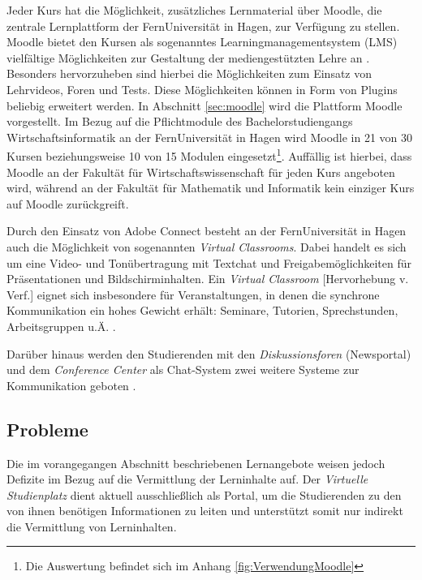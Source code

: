 Jeder Kurs hat die Möglichkeit, zusätzliches Lernmaterial über Moodle, die zentrale Lernplattform der FernUniversität in Hagen, zur Verfügung zu stellen. Moodle bietet den Kursen \glqq als sogenanntes Learningmanagementsystem (LMS) vielfältige Möglichkeiten zur Gestaltung der mediengestützten Lehre an\grqq{} \citep{fernuniversitaet2018moodle}. Besonders hervorzuheben sind hierbei die Möglichkeiten zum Einsatz von Lehrvideos, Foren und Tests. Diese Möglichkeiten können in Form von Plugins beliebig erweitert werden. In Abschnitt \ref{sec:moodle} wird die Plattform Moodle vorgestellt. Im Bezug auf die Pflichtmodule des Bachelorstudiengangs Wirtschaftsinformatik an der FernUniversität in Hagen wird Moodle in 21 von 30 Kursen beziehungsweise 10 von 15 Modulen eingesetzt\footnote{Die Auswertung befindet sich im Anhang \ref{fig:VerwendungMoodle}}. Auffällig ist hierbei, dass Moodle an der Fakultät für Wirtschaftswissenschaft für jeden Kurs angeboten wird, während an der Fakultät für Mathematik und Informatik kein einziger Kurs auf Moodle zurückgreift.

 


Durch den Einsatz von Adobe Connect besteht an der FernUniversität in Hagen auch die Möglichkeit von sogenannten \textit{Virtual Classrooms}. Dabei handelt es sich um eine Video- und Tonübertragung mit Textchat und Freigabemöglichkeiten für Präsentationen und Bildschirminhalten. \glqq Ein \emph{Virtual Classroom} [Hervorhebung v. Verf.] eignet sich insbesondere für Veranstaltungen, in denen die synchrone Kommunikation ein hohes Gewicht erhält: Seminare, Tutorien, Sprechstunden, Arbeitsgruppen u.Ä.\grqq{} \citep{fernuniversitaet2018kommunikationstools}.

Darüber hinaus werden den Studierenden mit den \textit{Diskussionsforen} (Newsportal) und dem \textit{Conference Center} als Chat-System zwei weitere Systeme zur Kommunikation geboten \citep{fernuniversitaet2018kommunikationstools}.


\subsection{Probleme}
Die im vorangegangen Abschnitt beschriebenen Lernangebote weisen jedoch Defizite im Bezug auf die Vermittlung der Lerninhalte auf. Der \textit{Virtuelle Studienplatz} dient aktuell ausschließlich als Portal, um die Studierenden zu den von ihnen benötigen Informationen zu leiten und unterstützt somit nur indirekt die Vermittlung von Lerninhalten.

